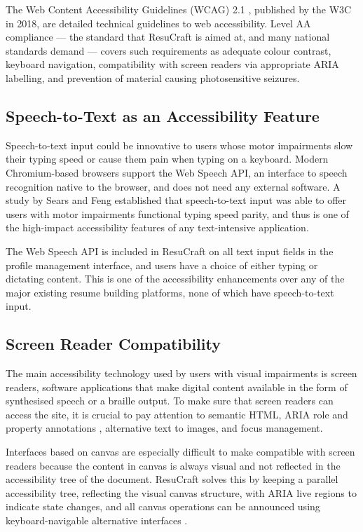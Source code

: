 \documentclass[12pt, a4paper, oneside]{report}
\begin{document}
The Web Content Accessibility Guidelines (WCAG) 2.1 \cite{wcag21}, published by the W3C in 2018, are detailed technical guidelines to web accessibility. Level AA compliance --- the standard that ResuCraft is aimed at, and many national standards demand --- covers such requirements as adequate colour contrast, keyboard navigation, compatibility with screen readers via appropriate ARIA labelling\cite{waiaria2023}, and prevention of material causing photosensitive seizures.

\subsection{Speech-to-Text as an Accessibility Feature}

Speech-to-text input could be innovative to users whose motor impairments slow their typing speed or cause them pain when typing on a keyboard. Modern Chromium-based browsers support the Web Speech API, an interface to speech recognition native to the browser, and does not need any external software. A study by Sears and Feng \cite{sears2003} established that speech-to-text input was able to offer users with motor impairments functional typing speed parity, and thus is one of the high-impact accessibility features of any text-intensive application.

The Web Speech API is included in ResuCraft on all text input fields in the profile management interface, and users have a choice of either typing or dictating content. This is one of the accessibility enhancements over any of the major existing resume building platforms, none of which have speech-to-text input.

\subsection{Screen Reader Compatibility}

The main accessibility technology used by users with visual impairments is screen readers, software applications that make digital content available in the form of synthesised speech or a braille output. To make sure that screen readers can access the site, it is crucial to pay attention to semantic HTML, ARIA role and property annotations \cite{waiaria2023}, alternative text to images, and focus management.

Interfaces based on canvas are especially difficult to make compatible with screen readers because the content in canvas is always visual and not reflected in the accessibility tree of the document. ResuCraft solves this by keeping a parallel accessibility tree, reflecting the visual canvas structure, with ARIA live regions to indicate state changes, and all canvas operations can be announced using keyboard-navigable alternative interfaces \cite{wcag21}.
\end{document}

